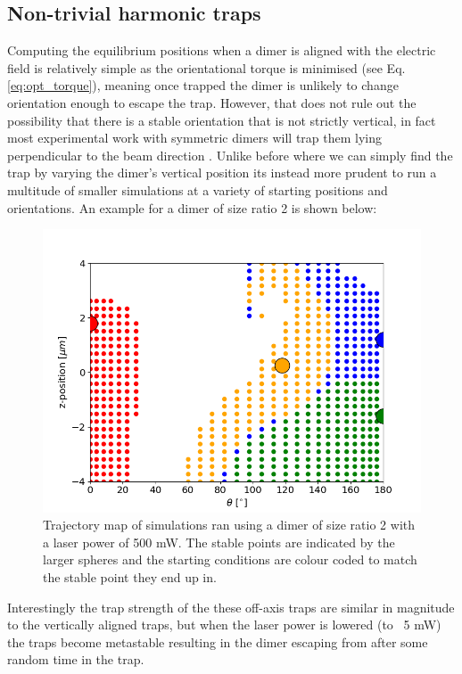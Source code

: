 \subsection{Non-trivial harmonic traps}\label{sec:off-axis}
Computing the equilibrium positions when a dimer is aligned with the electric field is relatively simple as the orientational torque is minimised (see Eq.\ref{eq:opt_torque}), meaning once trapped the dimer is unlikely to change orientation enough to escape the trap. However, that does not rule out the possibility that there is a stable orientation that is not strictly vertical, in fact most experimental work with symmetric dimers will trap them lying perpendicular to the beam direction \cite{Ahn2018}. Unlike before where we can simply find the trap by varying the dimer's vertical position its instead more prudent to run a multitude of smaller simulations at a variety of starting positions and orientations. An example for a dimer of size ratio 2 is shown below:

\begin{figure}[h!]
	\centering
	\includegraphics[width=0.75\linewidth]{off_axis_trap.png}
	\caption{Trajectory map of simulations ran using a dimer of size ratio 2 with a laser power of 500 mW. The stable points are indicated by the larger spheres and the starting conditions are colour coded to match the stable point they end up in.}
\end{figure}

Interestingly the trap strength of the these off-axis traps are similar in magnitude to the vertically aligned traps, but when the laser power is lowered (to ~5 mW) the traps become metastable resulting in the dimer escaping from after some random time in the trap. 


